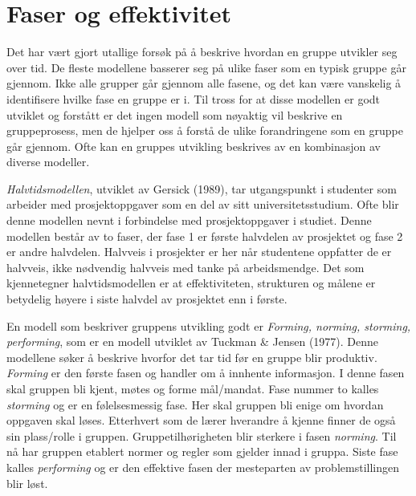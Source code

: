 \section{Faser og effektivitet}
Det har vært gjort utallige forsøk på å beskrive hvordan en gruppe utvikler seg over tid. 
De fleste modellene basserer seg på ulike faser som en typisk gruppe går gjennom. 
Ikke alle grupper går gjennom alle fasene, og det kan være vanskelig å identifisere hvilke fase en gruppe er i.
Til tross for at disse modellen er godt utviklet og forstått er det ingen modell som nøyaktig vil beskrive en gruppeprosess, men de hjelper oss å forstå de ulike forandringene som en gruppe går gjennom. 
Ofte kan en gruppes utvikling beskrives av en kombinasjon av diverse modeller\citep{levin}. 
\vspace{\secspace}

\textit{Halvtidsmodellen}, utviklet av Gersick (1989), tar utgangspunkt i studenter som arbeider med prosjektoppgaver som en del av sitt universitetsstudium.
Ofte blir denne modellen nevnt i forbindelse med prosjektoppgaver i studiet. 
Denne modellen består av to faser, der fase 1 er første halvdelen av prosjektet og fase 2 er andre halvdelen. 
Halvveis i prosjekter er her når studentene oppfatter de er halvveis, ikke nødvendig halvveis med tanke på arbeidsmendge. 
Det som kjennetegner halvtidsmodellen er at effektiviteten, strukturen og målene er betydelig høyere i siste halvdel av prosjektet enn i første.\citep{levin}
\vspace{\secspace}

En modell som beskriver gruppens utvikling godt er \textit{Forming, norming, storming, performing}, som er en modell utviklet av Tuckman \& Jensen (1977). 
Denne modellene søker å beskrive hvorfor det tar tid før en gruppe blir produktiv. 
\textit{Forming} er den første fasen og handler om å innhente informasjon. 
I denne fasen skal gruppen bli kjent, møtes og forme mål/mandat.
Fase nummer to kalles \textit{storming} og er en følelsesmessig fase. 
Her skal gruppen bli enige om hvordan oppgaven skal løses. 
Etterhvert som de lærer hverandre å kjenne finner de også sin plass/rolle i gruppen. 
Gruppetilhørigheten blir sterkere i fasen \textit{norming}. 
Til nå har gruppen etablert normer og regler som gjelder innad i gruppa. 
Siste fase kalles \textit{performing} og er den effektive fasen der mesteparten av problemstillingen blir løst. \citep{levin}
\vspace{\secspace}

